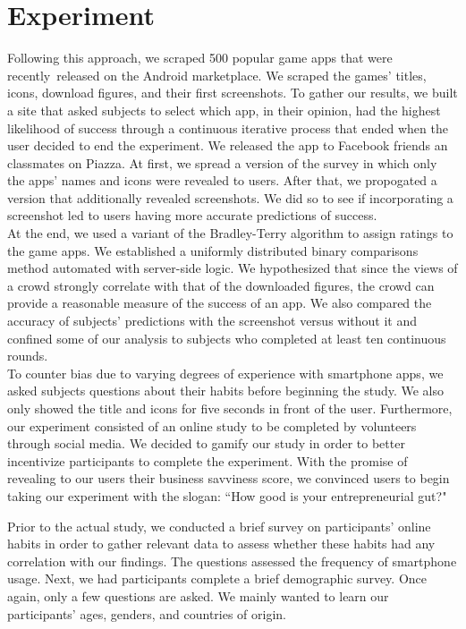 \section{Experiment}


Following this approach, we scraped 500 popular game apps that were recently released on the Android marketplace. We scraped the games' titles, icons, download figures, and their first screenshots. To gather our results, we built a site that asked subjects to select which app, in their opinion, had the highest likelihood of success through a continuous iterative process that ended when the user decided to end the experiment. We released the app to Facebook friends an classmates on Piazza. At first, we spread a version of the survey in which only the apps' names and icons were revealed to users. After that, we propogated a version that additionally revealed screenshots. We did so to see if incorporating a screenshot led to users having more accurate predictions of success. \\

At the end, we used a variant of the Bradley-Terry algorithm to assign ratings to the game apps. We established a uniformly distributed binary comparisons method automated with server-side logic. We hypothesized that since the views of a crowd strongly correlate with that of the downloaded figures, the crowd can provide a reasonable measure of the success of an app. We also compared the accuracy of subjects' predictions with the screenshot versus without it and confined some of our analysis to subjects who completed at least ten continuous rounds.  \\

To counter bias due to varying degrees of experience with smartphone apps, we asked subjects questions about their habits before beginning the study. We also only showed the title and icons for five seconds in front of the user.  Furthermore, our experiment consisted of an online study to be completed by volunteers through social media. We decided to gamify our study in order to better incentivize participants to complete the experiment. With the promise of revealing to our users their business savviness score, we convinced users to begin taking our experiment with the slogan: “How good is your entrepreneurial gut?" 

Prior to the actual study, we conducted a brief survey on participants' online habits in order to gather relevant data to assess whether these habits had any correlation with our findings. The questions assessed the frequency of smartphone usage. Next, we had participants complete a brief demographic survey. Once again, only a few questions are asked. We mainly wanted to learn our participants' ages, genders, and countries of origin.

